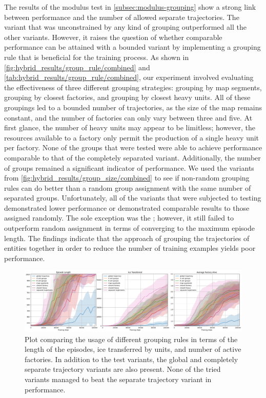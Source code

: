 \noindent The results of the modulus test in \autoref{subsec:modulus-grouping} show a strong link between performance and the number of allowed separate trajectories. The variant that was unconstrained by any kind of grouping outperformed all the other variants. However, it raises the question of whether comparable performance can be attained with a bounded variant by implementing a grouping rule that is beneficial for the training process. As shown in \autoref{fig:hybrid_results/group_rule/combined} and \autoref{tab:hybrid_results/group_rule/combined}, our experiment involved evaluating the effectiveness of three different grouping strategies: grouping by map segments, grouping by closest factories, and grouping by closest heavy units. All of these groupings led to a bounded number of trajectories, as the size of the map remains constant, and the number of factories can only vary between three and five. At first glance, the number of heavy units may appear to be limitless; however, the resources available to a factory only permit the production of a single heavy unit per factory. None of the groups that were tested were able to achieve performance comparable to that of the completely separated variant. Additionally, the number of groups remained a significant indicator of performance. We used the variants from \autoref{fig:hybrid_results/group_size/combined} to see if non-random grouping rules can do better than a random group assignment with the same number of separated groups. Unfortunately, all of the variants that were subjected to testing demonstrated lower performance or demonstrated comparable results to those assigned randomly. The sole exception was the ; however, it still failed to outperform random assignment in terms of converging to the maximum episode length. The findings indicate that the approach of grouping the trajectories of entities together in order to reduce the number of training examples yields poor performance.

\begin{figure}[htbp]
    \centering
    \includegraphics[width=1\linewidth]{images/results_hybrid/group_rule/combined.png}
    \captionsetup{justification=justified, singlelinecheck=false, width=1\linewidth, labelfont=bf} 
    \caption[]{Plot comparing the usage of different grouping rules in terms of the length of the episodes, ice transferred by units, and number of active factories. In addition to the test variants, the global and completely separate trajectory variants are also present. None of the tried variants managed to beat the separate trajectory variant in performance.}
    \label{fig:hybrid_results/group_rule/combined}
\end{figure}

